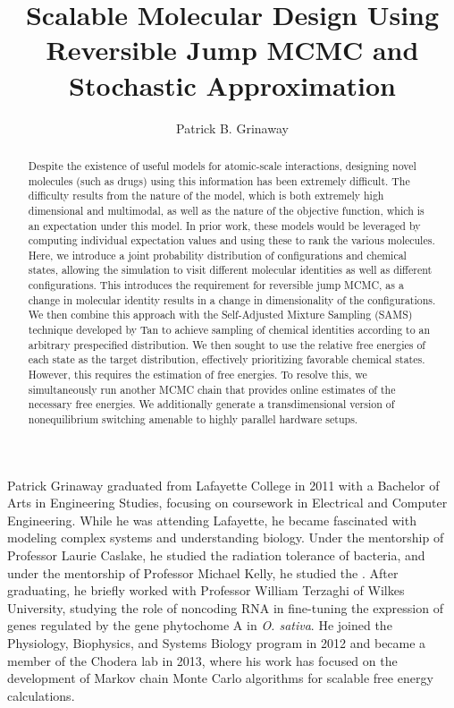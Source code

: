 \documentclass[phd,tocprelim]{cornell}
\title {Scalable Molecular Design Using Reversible Jump MCMC and Stochastic Approximation}
\author {Patrick B. Grinaway}
\begin{document}
\maketitle
\makecopyright

\begin{abstract}
Despite the existence of useful models for atomic-scale interactions, designing novel molecules (such as drugs) using this information has been extremely difficult. The difficulty results from the nature of the model, which is both extremely high dimensional and multimodal, as well as the nature of the objective function, which is an expectation under this model. In prior work, these models would be leveraged by computing individual expectation values and using these to rank the various molecules. Here, we introduce a joint probability distribution of configurations and chemical states, allowing the simulation to visit different molecular identities as well as different configurations. This introduces the requirement for reversible jump MCMC, as a change in molecular identity results in a change in dimensionality of the configurations. We then combine this approach with the Self-Adjusted Mixture Sampling (SAMS) technique developed by Tan to achieve sampling of chemical identities according to an arbitrary prespecified distribution. We then sought to use the relative free energies of each state as the target distribution, effectively prioritizing favorable chemical states. However, this requires the estimation of free energies. To resolve this, we simultaneously run another MCMC chain that provides online estimates of the necessary free energies. We additionally generate a transdimensional version of nonequilibrium switching amenable to highly parallel hardware setups.
\end{abstract}

\begin{biosketch}
Patrick Grinaway graduated from Lafayette College in 2011 with a Bachelor of Arts in Engineering Studies, focusing on coursework in Electrical and Computer Engineering. While he was attending Lafayette, he became fascinated with modeling complex systems and understanding biology. Under the mentorship of Professor Laurie Caslake, he studied the radiation tolerance of bacteria, and under the mentorship of Professor Michael Kelly, he studied the . After graduating, he briefly worked with Professor William Terzaghi of Wilkes University, studying the role of noncoding RNA in fine-tuning the expression of genes regulated by the gene phytochome A in \emph{O. sativa}. He joined the Physiology, Biophysics, and Systems Biology program in 2012 and became a member of the Chodera lab in 2013, where his work has focused on the development of Markov chain Monte Carlo algorithms for scalable free energy calculations.
\end{biosketch}
\end{document}
